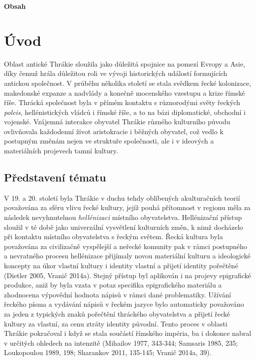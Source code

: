 {\bf Obsah}

\chapter{Úvod}

Oblast antické Thrákie sloužila jako důležitá spojnice na pomezí Evropy a Asie, díky čemuž hrála důležitou roli ve vývoji historických událostí formujících antickou společnost. V průběhu několika století se stala svědkem řecké kolonizace, makedonské expanze a nadvlády a konečně mocenského vzestupu a krize římské říše. Thrácká společnost byla v přímém kontaktu s různorodými světy řeckých {\em poleis}, hellénistických vládců i římské říše, a to na bázi diplomatické, obchodní i vojenské. Vzájemná interakce obyvatel Thrákie různého kulturního původu ovlivňovala každodenní život aristokracie i běžných obyvatel, což vedlo k postupným změnám nejen ve struktuře společnosti, ale i v ideových a materiálních projevech tamní kultury.

\section[představení-tématu]{Představení tématu}

V 19. a 20. století byla Thrákie v duchu tehdy oblíbených akulturačních teorií považována za sféru vlivu řecké kultury, jejíž pouhá přítomnost v regionu měla za následek nevyhnutelnou {\em hellénizaci} místního obyvatelstva. Hellénizační přístup sloužil v té době jako univerzální vysvětlení kulturních změn, k nimž docházelo při kontaktu místního obyvatelstva s řeckým světem. Řecká kultura byla považována za civilizačně vyspělejší a neřecké komunity pak v rámci postupného a nevratného procesu hellénizace přijímaly novou materiální kulturu a ideologické koncepty na úkor vlastní kultury i identity vlastní a přijetí identity pořečtěné (Dietler 2005, Vranič 2014a). Stejný přístup byl aplikován i na projevy epigrafické produkce, aniž by byla vzata v potaz specifika epigrafického materiálu a zhodnocena výpovědní hodnota nápisů v rámci dané problematiky. Užívání řeckého písma a vydávání nápisů v řeckém jazyce bylo automaticky považováno za jeden z typických znaků pořečtění thráckého obyvatelstva a přijetí řecké kultury za vlastní, za cenu ztráty identity původní. Tento proces v oblasti Thrákie pokračoval i když se stala součástí římského impéria, ba i dokonce nabral v určitých ohledech na intenzitě (Mihailov 1977, 343-344; Samsaris 1985, 235; Loukopoulou 1989, 198; Sharankov 2011, 135-145; Vranič 2014a, 39).


